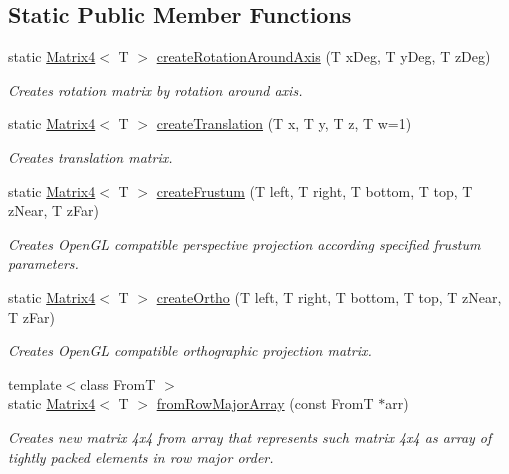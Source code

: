 \subsection*{Static Public Member Functions}
\begin{DoxyCompactItemize}
\item 
static \hyperlink{class_matrix4}{Matrix4}$<$ T $>$ \hyperlink{class_matrix4_a55c7865b25c33d0b02835a8ac8d32db8}{createRotationAroundAxis} (T xDeg, T yDeg, T zDeg)
\begin{DoxyCompactList}\small\item\em Creates rotation matrix by rotation around axis. \item\end{DoxyCompactList}\item 
static \hyperlink{class_matrix4}{Matrix4}$<$ T $>$ \hyperlink{class_matrix4_a7b68a758485c1f5b8239ed7632658519}{createTranslation} (T x, T y, T z, T w=1)
\begin{DoxyCompactList}\small\item\em Creates translation matrix. \item\end{DoxyCompactList}\item 
static \hyperlink{class_matrix4}{Matrix4}$<$ T $>$ \hyperlink{class_matrix4_a3874c4332bb5f89a03eac10641ad9f06}{createFrustum} (T left, T right, T bottom, T top, T zNear, T zFar)
\begin{DoxyCompactList}\small\item\em Creates OpenGL compatible perspective projection according specified frustum parameters. \item\end{DoxyCompactList}\item 
static \hyperlink{class_matrix4}{Matrix4}$<$ T $>$ \hyperlink{class_matrix4_af678671e87d2fafd79fe8b00344f2229}{createOrtho} (T left, T right, T bottom, T top, T zNear, T zFar)
\begin{DoxyCompactList}\small\item\em Creates OpenGL compatible orthographic projection matrix. \item\end{DoxyCompactList}\item 
{\footnotesize template$<$class FromT $>$ }\\static \hyperlink{class_matrix4}{Matrix4}$<$ T $>$ \hyperlink{class_matrix4_af5d6a66cc20b3558b448104099d9693e}{fromRowMajorArray} (const FromT $\ast$arr)
\begin{DoxyCompactList}\small\item\em Creates new matrix 4x4 from array that represents such matrix 4x4 as array of tightly packed elements in row major order. \item\end{DoxyCompactList}\item 

\end{DoxyCompactItemize}
